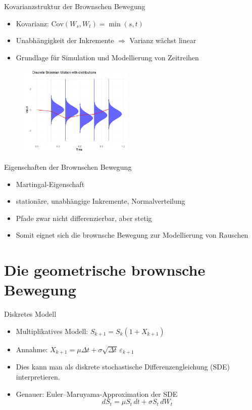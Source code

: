 \documentclass{beamer}
\begin{document}
\begin{frame}{Kovarianzstruktur der Brownschen Bewegung}
  \begin{itemize}
    \item Kovarianz: $\mathrm{Cov}(W_s,W_t)=\min(s,t)$
  \item Unabhängigkeit der Inkremente $\Rightarrow$ Varianz wächst linear
    \item Grundlage für Simulation und Modellierung von Zeitreihen
  \end{itemize}
  \begin{figure}
    \centering
  \includegraphics[width=0.48\textwidth]{../thesis/images/bb_with_cov.png}
  \end{figure}
\end{frame}

\begin{frame}{Eigenschaften der Brownschen Bewegung}
  \begin{itemize}
      \item Martingal-Eigenschaft
      \item stationäre, unabhängige Inkremente, Normalverteilung
      \item Pfade zwar nicht differenzierbar, aber stetig
      \item Somit eignet sich die brownsche Bewegung zur Modellierung von Rauschen
  \end{itemize}
\end{frame}

\section{Die geometrische brownsche Bewegung}

\begin{frame}{Diskretes Modell}
  \begin{itemize}
      \item Multiplikatives Modell: $S_{k+1}=S_k(1+X_{k+1})$
      \item Annahme: $X_{k+1}=\mu\Delta t+\sigma\sqrt{\Delta t}\,\varepsilon_{k+1}$
      \item Dies kann man als diskrete stochastische Differenzengleichung (SDE) interpretieren.
      \item Genauer: Euler--Maruyama-Approximation der SDE $$dS_t = \mu S_t\,dt + \sigma S_t\,dW_t$$
  \end{itemize}
\end{frame}
\end{document}
